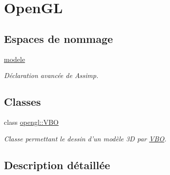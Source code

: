 \hypertarget{group__opengl}{\section{Open\-G\-L}
\label{group__opengl}
}
\subsection*{Espaces de nommage}
\begin{DoxyCompactItemize}
\item 
\hyperlink{namespacemodele}{modele}
\begin{DoxyCompactList}\small\item\em Déclaration avancée de Assimp. \end{DoxyCompactList}\end{DoxyCompactItemize}
\subsection*{Classes}
\begin{DoxyCompactItemize}
\item 
class \hyperlink{classopengl_1_1_v_b_o}{opengl\-::\-V\-B\-O}
\begin{DoxyCompactList}\small\item\em Classe permettant le dessin d'un modèle 3\-D par \hyperlink{classopengl_1_1_v_b_o}{V\-B\-O}. \end{DoxyCompactList}\end{DoxyCompactItemize}


\subsection{Description détaillée}
